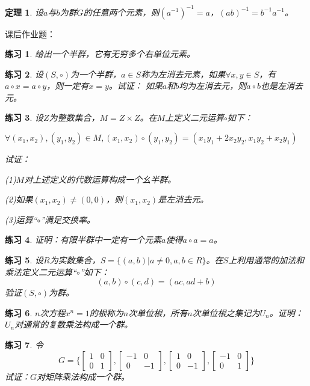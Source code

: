 \documentclass{article}
\newtheorem{Thm}{定理}
\newtheorem{Exercise}{练习}
\begin{document}
\begin{CJK*}{UTF8}{gbsn}
\begin{Thm}
  设$a$与$b$为群$G$的任意两个元素，则$(a^{-1})^{-1}=a$，$(ab)^{-1}=b^{-1}a^{-1}$。
\end{Thm}

  课后作业题：

\begin{Exercise}
  给出一个半群，它有无穷多个右单位元素。
\end{Exercise}

\begin{Exercise}
  设$(S,\circ)$为一个半群，$a\in S$称为左消去元素，如果$\forall x, y\in S$，有$a\circ x=a\circ y$，则一定有$x=y$。试证：
  如果$a$和$b$均为左消去元，则$a\circ b$也是左消去元。
\end{Exercise}

\begin{Exercise}
  设$Z$为整数集合，$M=Z\times Z$。在$M$上定义二元运算$\circ$如下：

  $\forall (x_1,x_2), (y_1,y_2)\in M, (x_1,x_2)\circ (y_1,y_2)=(x_1y_1+2x_2y_2,x_1y_2+x_2y_1)$

  试证：

  (1)$M$对上述定义的代数运算构成一个幺半群。

  (2)如果$(x_1,x_2)\neq (0,0)$，则$(x_1,x_2)$是左消去元。

  (3)运算“$\circ$”满足交换率。
\end{Exercise}


\begin{Exercise}
  证明：有限半群中一定有一个元素$a$使得$a\circ a=a$。
\end{Exercise}


\begin{Exercise}
  设$R$为实数集合，$S=\{(a,b)|a\neq 0,a,b\in R\}$。在$S$上利用通常的加法和乘法定义二元运算“$\circ$”如下：
  \[(a,b)\circ (c,d) = (ac, ad + b)\]
  验证$(S,\circ)$为群。
\end{Exercise}

\begin{Exercise}
  $n$次方程$x^n=1$的根称为$n$次单位根，所有$n$次单位根之集记为$U_n$。证明：$U_n$对通常的复数乘法构成一个群。
\end{Exercise}


\begin{Exercise}
 令
 \[G=\bigg\{\begin{bmatrix}
  1&0\\0&1
 \end{bmatrix},
 \begin{bmatrix}
  -1&0\\0&-1
 \end{bmatrix},
 \begin{bmatrix}
  1&0\\0&-1
 \end{bmatrix},
 \begin{bmatrix}
  -1&0\\0&1
 \end{bmatrix}\bigg\}\] 
 试证：$G$对矩阵乘法构成一个群。
\end{Exercise}




\end{CJK*}
\end{document}

